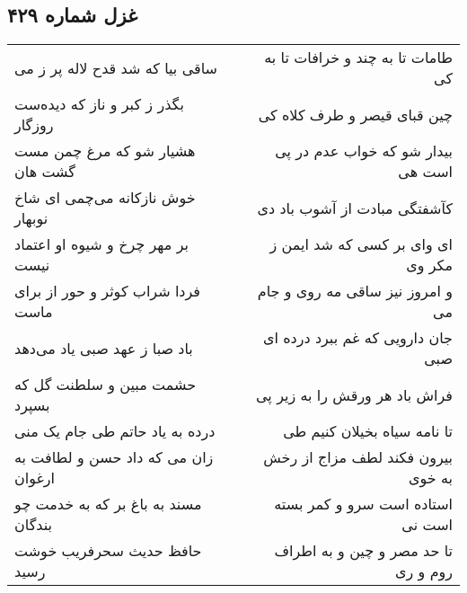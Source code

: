 \begin{center}
\section*{غزل شماره ۴۲۹}
\label{sec:sh429}
\begin{longtable}{l p{0.5cm} r}
ساقی بیا که شد قدح لاله پر ز می
&&
طامات تا به چند و خرافات تا به کی
\\
بگذر ز کبر و ناز که دیده‌ست روزگار
&&
چین قبای قیصر و طرف کلاه کی
\\
هشیار شو که مرغ چمن مست گشت هان
&&
بیدار شو که خواب عدم در پی است هی
\\
خوش نازکانه می‌چمی ای شاخ نوبهار
&&
کآشفتگی مبادت از آشوب باد دی
\\
بر مهر چرخ و شیوه او اعتماد نیست
&&
ای وای بر کسی که شد ایمن ز مکر وی
\\
فردا شراب کوثر و حور از برای ماست
&&
و امروز نیز ساقی مه روی و جام می
\\
باد صبا ز عهد صبی یاد می‌دهد
&&
جان دارویی که غم ببرد درده ای صبی
\\
حشمت مبین و سلطنت گل که بسپرد
&&
فراش باد هر ورقش را به زیر پی
\\
درده به یاد حاتم طی جام یک منی
&&
تا نامه سیاه بخیلان کنیم طی
\\
زان می که داد حسن و لطافت به ارغوان
&&
بیرون فکند لطف مزاج از رخش به خوی
\\
مسند به باغ بر که به خدمت چو بندگان
&&
استاده است سرو و کمر بسته است نی
\\
حافظ حدیث سحرفریب خوشت رسید
&&
تا حد مصر و چین و به اطراف روم و ری
\\
\end{longtable}
\end{center}
